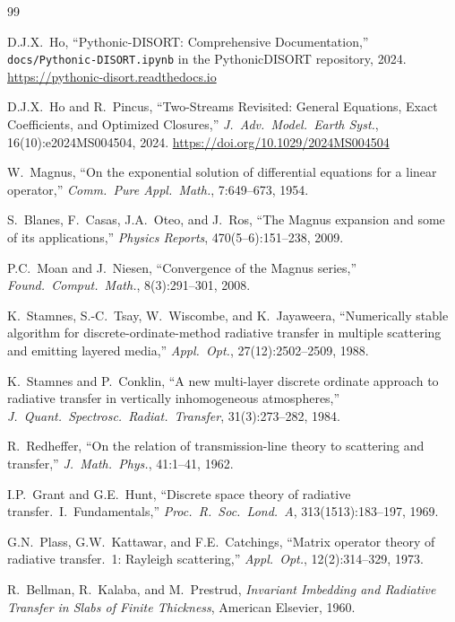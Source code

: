 \documentclass[11pt,a4paper]{article}
\theoremstyle{definition}
\begin{document}
\begin{thebibliography}{99}

D.J.X.~Ho, ``Pythonic-DISORT: Comprehensive Documentation,''
\texttt{docs/Pythonic-DISORT.ipynb} in the PythonicDISORT repository,
2024.
\url{https://pythonic-disort.readthedocs.io}

D.J.X.~Ho and R.~Pincus, ``Two-Streams Revisited: General Equations,
Exact Coefficients, and Optimized Closures,'' \emph{J.\ Adv.\ Model.\
Earth Syst.}, 16(10):e2024MS004504, 2024.
\url{https://doi.org/10.1029/2024MS004504}

W.~Magnus, ``On the exponential solution of differential equations for
a linear operator,'' \emph{Comm.\ Pure Appl.\ Math.}, 7:649--673,
1954.

S.~Blanes, F.~Casas, J.A.~Oteo, and J.~Ros, ``The Magnus expansion
and some of its applications,'' \emph{Physics Reports},
470(5--6):151--238, 2009.

P.C.~Moan and J.~Niesen, ``Convergence of the Magnus series,''
\emph{Found.\ Comput.\ Math.}, 8(3):291--301, 2008.

K.~Stamnes, S.-C.~Tsay, W.~Wiscombe, and K.~Jayaweera, ``Numerically
stable algorithm for discrete-ordinate-method radiative transfer in
multiple scattering and emitting layered media,'' \emph{Appl.\ Opt.},
27(12):2502--2509, 1988.

K.~Stamnes and P.~Conklin, ``A new multi-layer discrete ordinate
approach to radiative transfer in vertically inhomogeneous
atmospheres,'' \emph{J.\ Quant.\ Spectrosc.\ Radiat.\ Transfer},
31(3):273--282, 1984.

R.~Redheffer, ``On the relation of transmission-line theory to
scattering and transfer,'' \emph{J.\ Math.\ Phys.}, 41:1--41, 1962.

I.P.~Grant and G.E.~Hunt, ``Discrete space theory of radiative
transfer.\ I.~Fundamentals,'' \emph{Proc.\ R.\ Soc.\ Lond.\ A},
313(1513):183--197, 1969.

G.N.~Plass, G.W.~Kattawar, and F.E.~Catchings, ``Matrix operator
theory of radiative transfer.\ 1: Rayleigh scattering,''
\emph{Appl.\ Opt.}, 12(2):314--329, 1973.

R.~Bellman, R.~Kalaba, and M.~Prestrud, \emph{Invariant Imbedding and
Radiative Transfer in Slabs of Finite Thickness}, American Elsevier,
1960.


\end{thebibliography}
\end{document}
